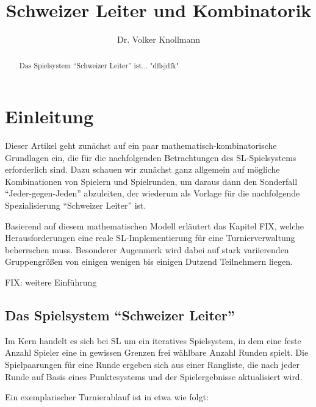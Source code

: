 \documentclass[DIV=15, 10pt]{scrartcl}
\begin{document}
\title{Schweizer Leiter und Kombinatorik}
\author{Dr. Volker Knollmann}

\maketitle

\begin{abstract}
Das Spielsystem "`Schweizer Leiter"' ist...  "dflsjdfk"
\end{abstract}

\section{Einleitung}

Dieser Artikel geht zunächst auf ein paar mathematisch-kombinatorische Grundlagen ein,
die für die nachfolgenden Betrachtungen des SL-Spielsystems erforderlich sind. Dazu
schauen wir zunächst ganz allgemein auf mögliche Kombinationen von Spielern und Spielrunden,
um daraus dann den Sonderfall "`Jeder-gegen-Jeden"' abzuleiten, der wiederum als Vorlage für
die nachfolgende Spezialisierung "`Schweizer Leiter"' ist.

Basierend auf diesem mathematischen Modell erläutert das Kapitel FIX, welche Herausforderungen
eine reale SL-Implementierung für eine Turnierverwaltung beherrschen muss. Besonderer Augenmerk
wird dabei auf stark variierenden Gruppengrößen von einigen wenigen bis einigen Dutzend
Teilnehmern liegen.

FIX: weitere Einführung

\subsection{Das Spielsystem "`Schweizer Leiter"'}

Im Kern handelt es sich bei SL um ein iteratives Spielsystem, in dem eine feste Anzahl Spieler eine in gewissen Grenzen frei wählbare Anzahl Runden spielt. Die Spielpaarungen für eine Runde ergeben sich aus einer Rangliste, die nach jeder Runde auf Basis eines Punktesystems und der Spielergebnisse aktualisiert wird.

Ein exemplarischer Turnierablauf ist in etwa wie folgt:
\end{document}
